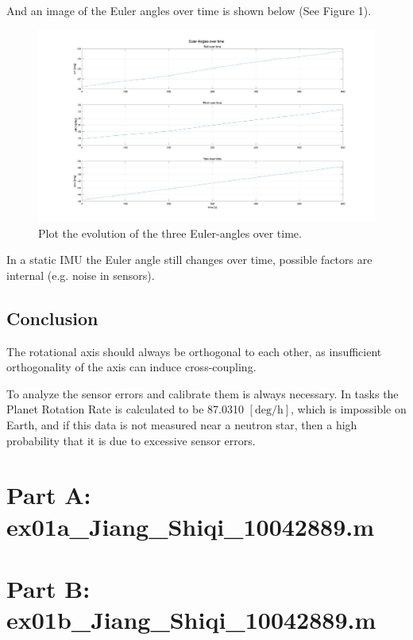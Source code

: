 \documentclass[class=article, crop=false]{standalone}
\begin{document}
\noindent And an image of the Euler angles over time is shown below (See Figure 1).

\begin{figure}
\centering
\includegraphics[width=1\textwidth]{ex01b_task5.png}
\caption{\label{fig:task5}Plot the evolution of the three Euler-angles over time.}
\end{figure}

In a static IMU the Euler angle still changes over time, possible factors are internal (e.g. noise in sensors).

\section{Conclusion}
The rotational axis should always be orthogonal to each other, as insufficient orthogonality of the axis can induce cross-coupling.

To analyze the sensor errors and calibrate them is always necessary. In tasks the Planet Rotation Rate is calculated to be 87.0310 $\mathrm{[deg/h]}$, which is impossible on Earth, and if this data is not measured near a neutron star, then a high probability that it is due to excessive sensor errors.
\newpage



\newpage
\appendix
\begin{appendices}

\chapter{Part A: ex01a\_Jiang\_Shiqi\_10042889.m}


\newpage
\chapter{Part B: ex01b\_Jiang\_Shiqi\_10042889.m}


\end{appendices}
\end{document}
